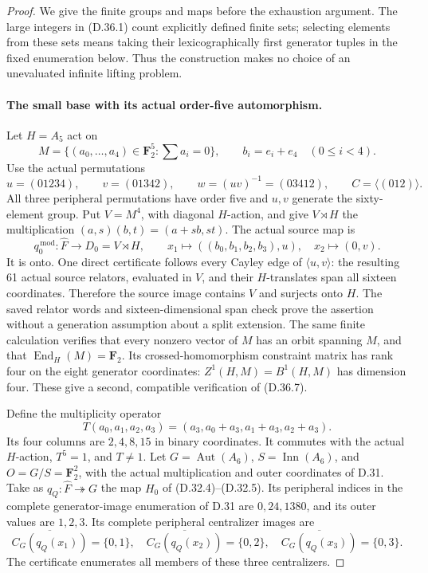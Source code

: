 \begin{proof}
We give the finite groups and maps before the exhaustion argument.
The large integers in \textup{(D.36.1)} count explicitly defined
finite sets; selecting elements from these sets means taking their
lexicographically first generator tuples in the fixed enumeration
below.  Thus the construction makes no choice of an unevaluated
infinite lifting problem.

\paragraph{The small base with its actual order-five automorphism.}
Let \(H=A_5\) act on
\[
 M=\{(a_0,\ldots,a_4)\in\mathbf F_2^5:\textstyle\sum a_i=0\},
 \qquad
 b_i=e_i+e_4\quad(0\leq i<4).
 \tag{D.36.5}
\]
Use the actual permutations
\[
 u=(01234),\qquad v=(01342),\qquad
 w=(uv)^{-1}=(03412),
 \qquad C=\langle(012)\rangle.
 \tag{D.36.6}
\]
All three peripheral permutations have order five and \(u,v\)
generate the sixty-element group.  Put \(V=M^4\), with diagonal
\(H\)-action, and give \(V\rtimes H\) the multiplication
\((a,s)(b,t)=(a+s b,st)\).  The actual source map is
\[
 q_0^{\,\mathrm{mod}}:\widehat F\longrightarrow D_0=V\rtimes H,
 \qquad
 x_1\longmapsto((b_0,b_1,b_2,b_3),u),\quad
 x_2\longmapsto(0,v).
 \tag{D.36.7}
\]
It is onto.  One direct certificate follows every Cayley edge of
\(\langle u,v\rangle\): the resulting 61 actual source relators,
evaluated in \(V\), and their \(H\)-translates span all sixteen
coordinates.  Therefore the source image contains \(V\) and
surjects onto \(H\).  The saved relator words and sixteen-dimensional
span check prove the assertion without a generation assumption
about a split extension.  The same finite calculation verifies
that every nonzero vector of \(M\) has an orbit spanning \(M\),
and that \(\operatorname{End}_H(M)=\mathbf F_2\).
Its crossed-homomorphism constraint matrix has rank four on the
eight generator coordinates: \(Z^1(H,M)=B^1(H,M)\) has dimension
four.  These give a second, compatible verification of
\textup{(D.36.7)}.

Define the multiplicity operator
\[
 T(a_0,a_1,a_2,a_3)
       =(a_3,a_0+a_3,a_1+a_3,a_2+a_3).
 \tag{D.36.8}
\]
Its four columns are \(2,4,8,15\) in binary coordinates.
It commutes with the actual \(H\)-action, \(T^5=1\), and \(T\ne1\).
Let \(G=\operatorname{Aut}(A_6)\), \(S=\operatorname{Inn}(A_6)\),
and \(O=G/S=\mathbf F_2^2\), with the actual multiplication and
outer coordinates of D.31.  Take as \(q_Q:\widehat F\twoheadrightarrow G\)
the map \(H_0\) of \textup{(D.32.4)--(D.32.5)}.  Its peripheral
indices in the complete generator-image enumeration of D.31
are \(0,24,1380\), and its outer values are \(1,2,3\).
Its complete peripheral centralizer images are
\[
 \overline{C_G(q_Q(x_1))}=\{0,1\},\quad
 \overline{C_G(q_Q(x_2))}=\{0,2\},\quad
 \overline{C_G(q_Q(x_3))}=\{0,3\}.
 \tag{D.36.9}
\]
The certificate enumerates all members of these three centralizers.


\end{proof}
